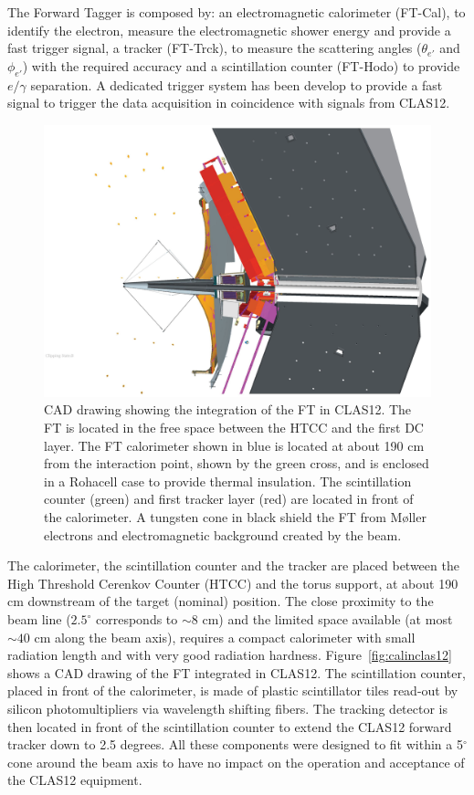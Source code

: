 The Forward Tagger is composed by: 
an electromagnetic calorimeter  (FT-Cal), to identify the
electron, measure the electromagnetic shower energy and provide a fast trigger signal, a tracker (FT-Trck),  to measure the scattering angles ($\theta_{e'}$ and $\phi_{e'}$) with the required accuracy and a  scintillation counter (FT-Hodo) to provide $e/\gamma$ separation. A dedicated trigger system has been develop to provide a fast signal to trigger the data acquisition in coincidence with signals from CLAS12.
\begin{figure}[th!]
\centering 
\includegraphics[width=0.85\columnwidth]{./fig/ft_cad.eps} 
\caption{CAD drawing showing the integration of the FT in CLAS12. The FT is located in the free space between the HTCC and the first DC layer. The FT calorimeter shown in blue is located at about 190 cm from the interaction point, shown by the green cross, and is enclosed in a Rohacell case to provide thermal insulation. The scintillation counter (green) and first tracker layer (red) are located in front of the calorimeter. A tungsten cone in black shield the FT from M{\o}ller electrons and electromagnetic background created by the beam. } 
\label{fig:calinclas} 
\end{figure}

The calorimeter, the scintillation counter and the tracker
are placed between the High Threshold Cerenkov Counter (HTCC)  and the torus support, at about 190 cm downstream of the target (nominal) position. The close proximity
to the beam line ($2.5^\circ$ corresponds to $\sim 8$ cm) and the limited space available (at most $\sim 40$ cm along the beam axis), requires a compact calorimeter with small radiation length and with very good radiation hardness. Figure~\ref{fig:calinclas12} shows 
a CAD drawing of the FT integrated in CLAS12. 
The scintillation counter, placed in front of the calorimeter, is made of plastic scintillator tiles 
read-out by silicon photomultipliers via wavelength shifting fibers. The tracking detector is then located in front of the scintillation counter to extend the CLAS12 forward tracker down to 2.5 degrees.
All these components were designed to fit within a 5$^{\circ}$ cone around the beam axis to have no impact on the operation and acceptance of the CLAS12 equipment.
